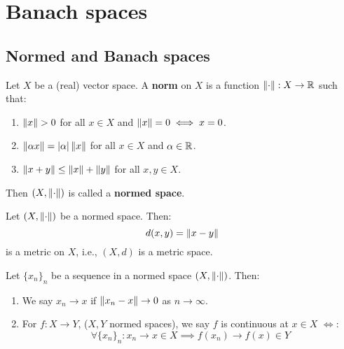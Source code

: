 \chapter{Banach spaces}

\section{Normed and Banach spaces}

\begin{fdefinition}
    Let $X$ be a (real) vector space. A \textbf{norm} on $X$ is a 
    function $\left\|\cdot\right\|: X \to \mathbb{R}$ such that:
    \vspace{1em}
    \begin{enumerate}[label=(\roman*)]
        \item $\left\|x\right\| > 0$ for all $x \in X$ and $\left\|x\right\| = 0 \iff x = 0$.
        \vspace{1em}
        \item $\left\|\alpha x\right\| = |\alpha| \left\|x\right\|$ for all $x \in X$ and $\alpha \in \mathbb{R}$.
        \vspace{1em}
        \item $\left\|x + y\right\| \leq \left\|x\right\| + \left\|y\right\|$ for all $x, y \in X$.
    \end{enumerate}
    \vspace{1em}
    Then $(X, \left\|\cdot\right\|)$ is called a \textbf{normed space}.
\end{fdefinition}

\begin{fproposition}
    Let $(X, \left\|\cdot\right\|)$ be a normed space. Then:
    $$d(x, y) = \left\|x - y\right\|$$
    is a metric on $X$, i.e., $(X, d)$ is a metric space.
\end{fproposition}

\vspace{1em}

\begin{fproposition}
    Let $\{x_n\}_n$ be a sequence in a normed space $(X, \left\|\cdot\right\|)$. Then:
    \vspace{1em}
    \begin{enumerate}[label=(\roman*)]
        \item We say $x_n \to x$ if $\left\|x_n - x\right\| \to 0$ as $n \to \infty$.
        \vspace{1em}
        \item For $f: X \to Y$, ($X, Y$ normed spaces), we say $f$ is continuous at $x \in X$ $\iff$:
        $$\forall \{x_n\}_n: x_n \to x \in X \implies f(x_n) \to f(x) \in Y$$
    \end{enumerate}
\end{fproposition}

